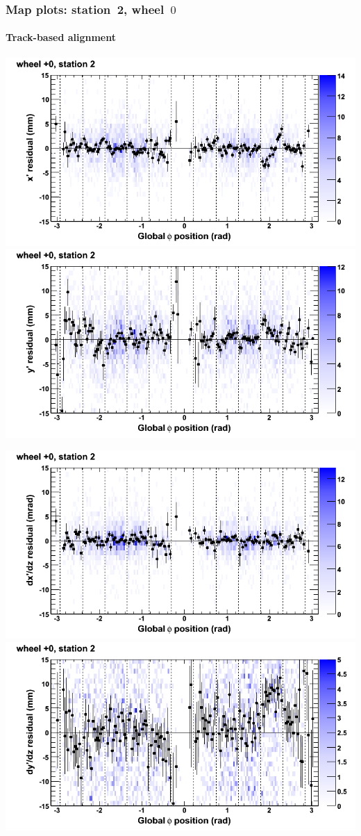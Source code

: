 \documentclass[compress]{beamer}
\begin{document}
\begin{frame}
\frametitle{Map plots: station~2, wheel~$0$}
\framesubtitle{Track-based alignment}
\includegraphics[width=0.5\linewidth]{mapplots_re05/DTvsphi_st2whC_x.png}
\includegraphics[width=0.5\linewidth]{mapplots_re05/DTvsphi_st2whC_y.png}

\includegraphics[width=0.5\linewidth]{mapplots_re05/DTvsphi_st2whC_dxdz.png}
\includegraphics[width=0.5\linewidth]{mapplots_re05/DTvsphi_st2whC_dydz.png}
\end{frame}
\end{document}
